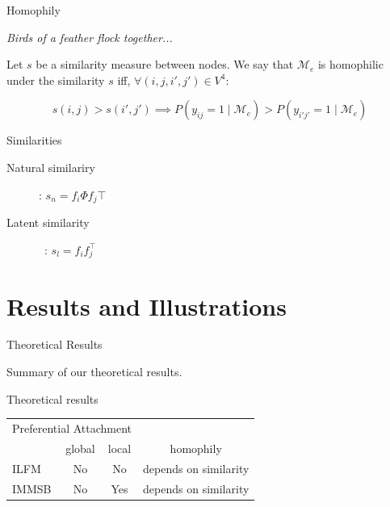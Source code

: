 \begin{frame}[c]{Homophily}

\emph{Birds of a feather flock together...}
\vspace{2em}

\begin{definition}[Homophily]
Let $s$ be a similarity measure between nodes. 
We say that $\mathcal{M}_e$ is homophilic under the similarity $s$ iff, $\forall (i,j,i',j') \in V^4$:

\[ s(i,j) > s(i',j')  \implies P(y_{ij}=1 \mid \mathcal{M}_e) > P(y_{i'j'}=1  \mid \mathcal{M}_e) \]

\end{definition}

\begin{block}{Similarities}
    \begin{description}
    \item[Natural similariry] : $s_n = f_i \Phi f_j\top $
    \item[Latent similarity] \ : $s_l = f_i f_j^\top$
    \end{description} 
\end{block}

\end{frame}



\section{Results and Illustrations}

\begin{frame}[c]{Theoretical Results}

    Summary of our theoretical results. %
    \vspace{1cm}


    \begin{block}{Theoretical results}
	\begin{tabular}{l|cc|c}

        \multicolumn{3}{c}{\hspace{1.3cm}Preferential Attachment}   \\
        \cmidrule(l){2-3} 
        &   global & local  &   homophily      \\
        \hline
        ILFM       & \cellcolor{red!25}No & \cellcolor{red!25}No   & depends on similarity  \\
        IMMSB       & \cellcolor{red!25}No & \cellcolor{green!25}Yes  & depends on similarity \\
    \end{tabular}

    \end{block}

\end{frame}

